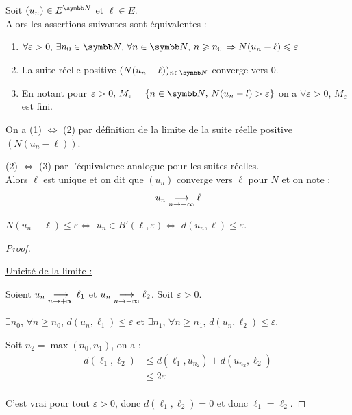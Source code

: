\begin{definition}{}{}
    Soit $(u_n) \in E^{\N}$ et $\ell \in E$. \\

    Alors les assertions suivantes sont équivalentes : 
    \begin{enumerate}
        \item $\forall \varepsilon > 0, \, \exists n_0 \in \N, \, \forall n \in \N, \, n \geqslant n_0 \, \Rightarrow N(u_n - \ell) \leqslant \varepsilon$
        \item La suite réelle positive $(N(u_n - \ell))_{n \in \N}$ converge vers 0.
        \item En notant pour $\varepsilon > 0, \, M_\varepsilon = \{n \in \N, \, N(u_n - l) > \varepsilon\}$ on a
            $\forall \varepsilon > 0, \, M_\varepsilon$ est fini. \\
    \end{enumerate}

    On a (1) $\iff$ (2) par définition de la limite de la suite réelle positive $(N(u_n - \ell))$.

    (2) $\iff$ (3) par l'équivalence analogue pour les suites réelles.\\

    Alors $\ell$ est unique et on dit que $(u_n)$ converge vers $\ell$ pour $N$ et on note :
    \[u_n \underset{n \to +\infty}{\longrightarrow} \ell\]
\end{definition}

\begin{remarque}
    $N(u_n - \ell) \leqslant \varepsilon \iff$ $u_n \in B'(\ell, \varepsilon) \iff$ $d(u_n, \ell) \leqslant \varepsilon$.
\end{remarque}


\begin{proof}~

    \uline{Unicité de la limite :}

    \avspace Soient $u_n \underset{n \to +\infty}{\longrightarrow} \ell_1$ et $u_n \underset{n \to +\infty}{\longrightarrow} \ell_2$.
    Soit $\varepsilon > 0$. 

    $\exists n_0, \, \forall n \geqslant n_0, \, d(u_n, \ell_1) \leqslant \varepsilon$ et
    $\exists n_1, \, \forall n \geqslant n_1, \, d(u_n, \ell_2) \leqslant \varepsilon$.

    Soit $n_2 = \max(n_0, n_1)$, on a :
    \begin{align*}
        d(\ell_1, \ell_2) & \leqslant d(\ell_1, u_{n_2}) + d(u_{n_2}, \ell_2) \\
        &\leqslant 2\varepsilon \\
    \end{align*}

    C'est vrai pour tout $\varepsilon > 0$, donc $d(\ell_1, \ell_2) = 0$ et donc $\ell_1 = \ell_2$.
\end{proof}

